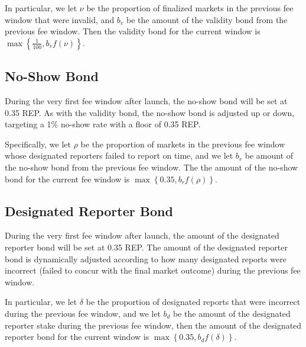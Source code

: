 \documentclass[floatfix,reprint,nofootinbib,amsmath,amssymb,epsfig,pre,floats,letterpaper,groupedaffiliation]{revtex4-1}
\theoremstyle{definition}
\theoremstyle{definition}
\begin{document}
\begin{appendix}
In particular, we let $\nu$ be the proportion of finalized markets in the previous fee window that were invalid, and $b_v$ be the amount of the validity bond from the previous fee window. Then the validity bond for the current window is $\max\left\{\frac{1}{100}, b_v f(\nu)\right\}$.

\subsection{No-Show Bond}\label{section:bond_size_adjustment_details_no-show_bonds}

During the very first fee window after launch, the no-show bond will be set at 0.35 REP. As with the validity bond, the no-show bond is adjusted up or down, targeting a 1\% no-show rate with a floor of 0.35 REP.

Specifically, we let $\rho$ be the proportion of markets in the previous fee window whose designated reporters failed to report on time, and we let $b_r$ be amount of the no-show bond from the previous fee window. The the amount of the no-show bond for the current fee window is $\max\left\{0.35,b_r f(\rho)\right\}$.

\subsection{Designated Reporter Bond}\label{section:bond_size_adjustment_details_designated_reporter_stake}

During the very first fee window after launch, the amount of the designated reporter bond will be set at 0.35 REP. The amount of the designated reporter bond is dynamically adjusted according to how many designated reports were incorrect (failed to concur with the final market outcome) during the previous fee window.

In particular, we let $\delta$ be the proportion of designated reports that were incorrect during the previous fee window, and we let $b_d$ be the amount of the designated reporter stake during the previous fee window, then the amount of the designated reporter bond for the current window is $\max\left\{0.35, b_d f(\delta)\right\}$.


\end{appendix}
\end{document}
